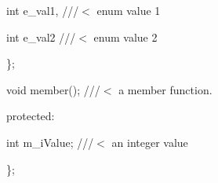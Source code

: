 \documentclass[a4paper,11pt,CJK]{article}
\begin{document}
\begin{CJK}{UTF8}{gbsn}
{\begin{minipage}{400pt}
\hspace{6ex}      int e\_val1,     ///$<$ enum value 1 \par
\hspace{6ex}      int e\_val2      ///$<$ enum value 2 \par
\hspace{3ex}    \};\par
\hspace{3ex}    void member();   ///$<$ a member function.\par
\par
\hspace{2ex}  protected:\par
\hspace{3ex}    int m\_iValue;       ///$<$ an integer value\par
\};
\end{minipage}
}
\\
\\
\\


\end{CJK}
\end{document}
